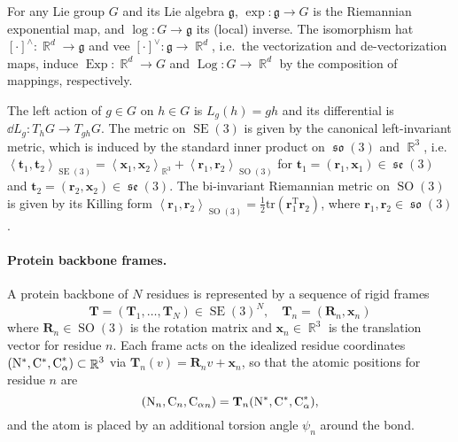 \documentclass{article}
\theoremstyle{plain}
\theoremstyle{definition}
\theoremstyle{remark}
\DeclareMathOperator{\SE}{SE}
\DeclareMathOperator{\SO}{SO}
\DeclareMathOperator{\se}{\mathfrak{se}}
\DeclareMathOperator{\so}{\mathfrak{so}}
\DeclareMathOperator{\Exp}{\operatorname{Exp}}
\DeclareMathOperator{\Log}{\operatorname{Log}}
\DeclareMathOperator{\R}{\mathbb{R}}
\newcommand{\inner}[2]{\left\langle #1, #2\right\rangle}
\begin{document}
For any Lie group $G$ and its Lie algebra $\mathfrak{g}$, $\exp:\mathfrak{g}\to G$ is the Riemannian exponential map, and $\log:G\to\mathfrak{g}$ its (local) inverse. The isomorphism hat $[\cdot]^\wedge:\R^d \to\mathfrak{g}$ and vee $[\cdot]^\vee:\mathfrak{g}\to\R^d$, i.e.\ the vectorization and de-vectorization maps, induce $\Exp:\R^d\to G$ and $\Log:G\to\R^d$ by the composition of mappings, respectively.

The left action of $g\in G$ on $h\in G$ is $L_g(h)=gh$ and its differential is $\dd L_g: T_hG\to T_{gh}G$. The metric on $\SE(3)$ is given by the canonical left-invariant metric, which is induced by the standard inner product on $\so(3)$ and $\R^3$, i.e.\ $\inner{\mathbf{t}_1}{\mathbf{t}_2}_{\SE(3)}=\inner{\mathbf{x}_1}{\mathbf{x}_2}_{\R^3}+\inner{\mathbf{r}_1}{\mathbf{r}_2}_{\SO(3)}$ for $\mathbf{t}_1 =(\mathbf{r}_1,\mathbf{x}_1) \in \se(3)$ and $\mathbf{t}_2 =(\mathbf{r}_2,\mathbf{x}_2) \in \se(3)$. The bi-invariant Riemannian metric on $\SO(3)$ is given by its Killing form $\inner{\mathbf{r}_1}{\mathbf{r}_2}_{\SO(3)}=\frac{1}{2}\mathrm{tr}(\mathbf{r}_1^\mathrm{T}\mathbf{r}_2)$, where $\mathbf{r}_1,\mathbf{r}_2\in\so(3)$.

\paragraph{Protein backbone frames.}
A protein backbone of $N$ residues is represented by a sequence of rigid frames
\begin{equation*}
    \mathbf{T} = (\mathbf{T}_1,\dots,\mathbf{T}_N) \in \SE(3)^N,
    \quad \mathbf{T}_n=(\mathbf{R}_n,\mathbf{x}_n)
\end{equation*}
where $\mathbf{R}_n\in\SO(3)$ is the rotation matrix and $\mathbf{x}_n\in\R^3$ is the translation vector for residue $n$.
Each frame acts on the idealized residue coordinates $(\ce{N}^*,\ce{C}^*,\ce{C_\alpha}^*)\subset\R^3$ via
$\mathbf{T}_n(v)=\mathbf{R}_n v+\mathbf{x}_n$, so that the atomic positions for residue $n$ are
\begin{equation*}
    (\ce{N}_n,\ce{C}_n,{\ce{C_\alpha}}_n)=\mathbf{T}_n (\ce{N}^*,\ce{C}^*,\ce{C_\alpha}^*),
\end{equation*}
and the  atom is placed by an additional torsion angle $\psi_n$ around the  bond.
\end{document}
